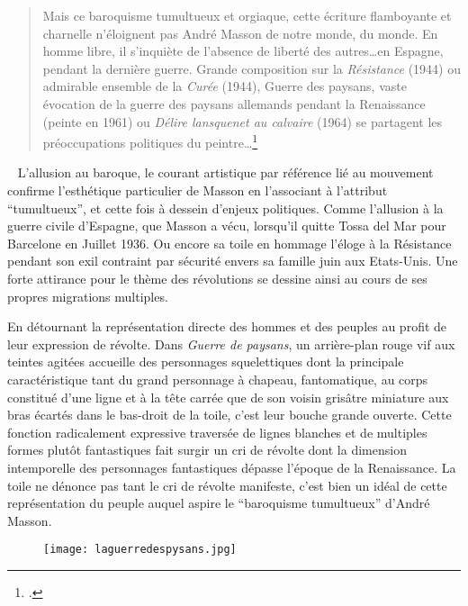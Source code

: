 \begin{quote}
Mais ce baroquisme tumultueux et orgiaque, cette écriture flamboyante et charnelle n’éloignent pas André Masson de notre monde, du monde. En homme libre, il s’inquiète de l’absence de liberté des autres…en Espagne, pendant la dernière guerre. Grande composition sur la \emph{Résistance} (1944) ou admirable ensemble de la \emph{Curée} (1944), Guerre des paysans, vaste évocation de la guerre des paysans allemands pendant la Renaissance (peinte en 1961) ou \emph{Délire lansquenet au calvaire} (1964) se partagent les préoccupations politiques du peintre…\footcite{massonlyon}\end{quote}
 
	L’allusion au baroque, le courant artistique par référence lié au mouvement confirme l’esthétique particulier de Masson en l’associant à l’attribut \enquote{tumultueux}, et cette fois à dessein d’enjeux politiques. Comme l’allusion à la guerre civile d’Espagne, que Masson a vécu, lorsqu’il quitte Tossa del Mar pour Barcelone en Juillet 1936. Ou encore sa toile en hommage l’éloge à la Résistance pendant son exil contraint par sécurité envers sa famille juin aux Etats-Unis. Une forte attirance pour le thème des révolutions se dessine ainsi au cours de ses propres migrations multiples. 

En détournant la représentation directe des hommes et des peuples au profit de leur expression de révolte. Dans \emph{Guerre de paysans}, un arrière-plan rouge vif aux teintes agitées accueille des personnages squelettiques dont la principale caractéristique tant du grand personnage à chapeau, fantomatique, au corps constitué d’une ligne et à la tête carrée que de son voisin grisâtre miniature aux bras écartés dans le bas-droit de la toile, c’est leur bouche grande ouverte. Cette fonction radicalement expressive traversée de lignes blanches et de multiples formes plutôt fantastiques fait surgir un cri de révolte dont la dimension intemporelle des personnages fantastiques dépasse l’époque de la Renaissance. La toile ne dénonce pas tant le cri de révolte manifeste, c’est bien un idéal de cette représentation du peuple auquel aspire le \enquote{baroquisme tumultueux} d’André Masson.

\begin{figure}[H]
   \centering
   \texttt{[image: laguerredespysans.jpg]}
	\caption{\cite{massonlyon}}\label{fig:Guerre des paysans}
\end{figure}


